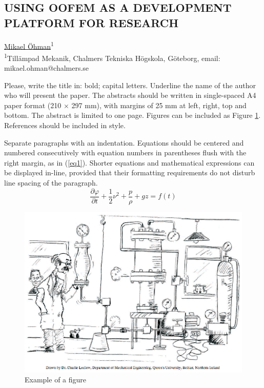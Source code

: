 \documentclass{article}
\begin{document}
\begin{center}
\section*{USING OOFEM AS A DEVELOPMENT PLATFORM FOR RESEARCH}
%
\begin{minipage}[t]{\textwidth}
\centering
\underline{Mikael Öhman}\textsuperscript{1} \\
\vspace{0.5cm}
\textsuperscript{1}Tillämpad Mekanik, Chalmers Tekniska Högskola, Göteborg, email: mikael.ohman@chalmers.se
\end{minipage}
\end{center}

\large
Please, write the title in: bold; capital letters. Underline the name of the author who will present the paper. The abstracts should be written in single-spaced A4 paper format (210 $\times$ 297 mm), with margins of 25 mm at left, right, top and bottom. The abstract is limited to one page. Figures can be included as Figure \ref{Figure1}. References should be included in \cite{Lars} style.

Separate paragraphs with an indentation. Equations should be centered and numbered consecutively with equation numbers in parentheses flush with the right margin, as in (\ref{eq1}). Shorter equations and mathematical expressions can be displayed in-line, provided that their formatting requirements do not disturb line spacing of the paragraph.
%
\begin{equation}\label{eq1}
\frac{\partial{\varphi}}{\partial{t}}+\frac{1}{2}\nu^2+\frac{p}{\rho}+gz=f(t)
\end{equation}
%
\begin{figure}[htb]
\begin{center}
\begin{minipage}[t]{.45\textwidth}
\includegraphics[width=\textwidth]{pic}
\caption{\footnotesize Example of a figure} \label{Figure1}
\end{minipage}
\end{center}
\end{figure}
\end{document}
